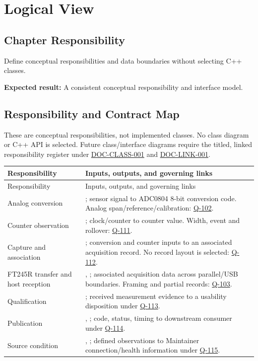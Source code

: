 \chapter{Logical View}
\section{Chapter Responsibility}
\label{Section:LogicalViewResponsibility}
Define conceptual responsibilities and data boundaries without selecting C++ classes.

\noindent\textbf{Expected result:} A consistent conceptual responsibility and interface model.

\section{Responsibility and Contract Map}
These are conceptual responsibilities, not implemented classes. No class diagram or C++ API is selected. Future class/interface diagrams require the titled, linked responsibility register under \hyperref[Requirement:DOCCLASS001]{DOC-CLASS-001} and \hyperref[Requirement:DOCLINK001]{DOC-LINK-001}.

\small
\begin{tabularx}{\linewidth}{L{3.0cm}Y}
\caption{Measurement Responsibilities\label{Table:MeasurementResponsibilities}}\\
\toprule
Responsibility & Inputs, outputs, and governing links\\\midrule
\endfirsthead
\toprule
Responsibility & Inputs, outputs, and governing links\\\midrule
\endhead
\bottomrule
\endlastfoot
Analog conversion & ; sensor signal to ADC0804 8-bit conversion code. Analog span/reference/calibration: \hyperref[Question:Q-102]{Q-102}.\\
Counter observation & ; clock/counter to counter value. Width, event and rollover: \hyperref[Question:Q-111]{Q-111}.\\
Capture and association & ; conversion and counter inputs to an associated acquisition record. No record layout is selected: \hyperref[Question:Q-112]{Q-112}.\\
FT245R transfer and host reception & , ; associated acquisition data across parallel/USB boundaries. Framing and partial records: \hyperref[Question:Q-103]{Q-103}.\\
Qualification & ; received measurement evidence to a usability disposition under \hyperref[Question:Q-113]{Q-113}.\\
Publication & , ; code, status, timing to downstream consumer under \hyperref[Question:Q-114]{Q-114}.\\
Source condition & , ; defined observations to Maintainer connection/health information under \hyperref[Question:Q-115]{Q-115}.\\
\end{tabularx}
\normalsize

